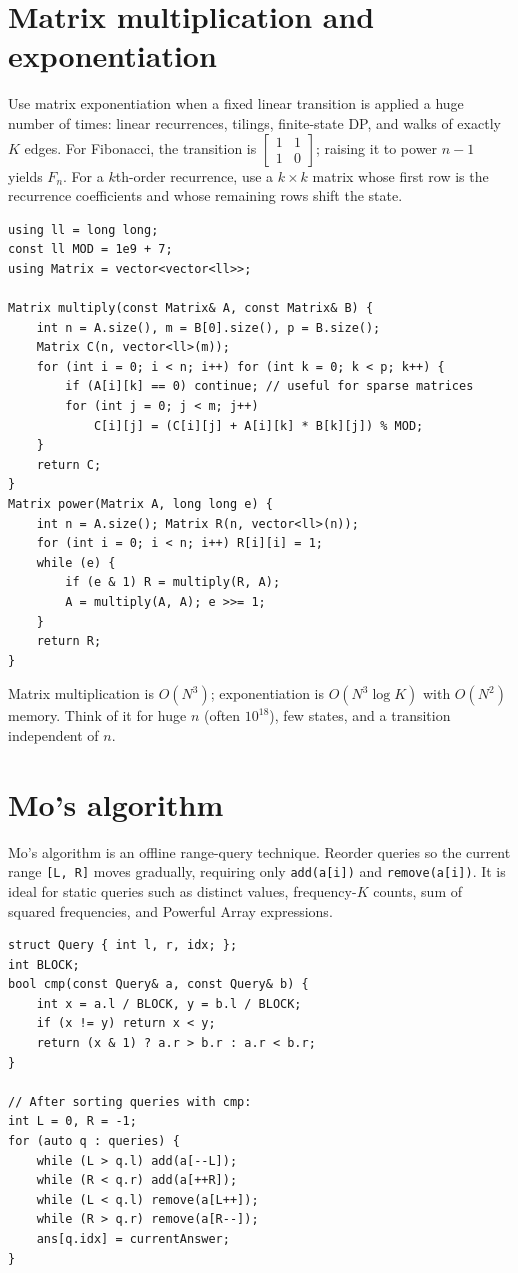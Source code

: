 \section{Matrix multiplication and exponentiation}

Use matrix exponentiation when a fixed linear transition is applied a huge number of times: linear recurrences, tilings, finite-state DP, and walks of exactly $K$ edges. For Fibonacci, the transition is $\begin{bmatrix}1&1\\1&0\end{bmatrix}$; raising it to power $n-1$ yields $F_n$. For a $k$th-order recurrence, use a $k \times k$ matrix whose first row is the recurrence coefficients and whose remaining rows shift the state.

\begin{lstlisting}
using ll = long long;
const ll MOD = 1e9 + 7;
using Matrix = vector<vector<ll>>;

Matrix multiply(const Matrix& A, const Matrix& B) {
    int n = A.size(), m = B[0].size(), p = B.size();
    Matrix C(n, vector<ll>(m));
    for (int i = 0; i < n; i++) for (int k = 0; k < p; k++) {
        if (A[i][k] == 0) continue; // useful for sparse matrices
        for (int j = 0; j < m; j++)
            C[i][j] = (C[i][j] + A[i][k] * B[k][j]) % MOD;
    }
    return C;
}
Matrix power(Matrix A, long long e) {
    int n = A.size(); Matrix R(n, vector<ll>(n));
    for (int i = 0; i < n; i++) R[i][i] = 1;
    while (e) {
        if (e & 1) R = multiply(R, A);
        A = multiply(A, A); e >>= 1;
    }
    return R;
}
\end{lstlisting}

Matrix multiplication is $O(N^3)$; exponentiation is $O(N^3 \log K)$ with $O(N^2)$ memory. Think of it for huge $n$ (often $10^{18}$), few states, and a transition independent of $n$.

\section{Mo's algorithm}

Mo's algorithm is an offline range-query technique. Reorder queries so the current range \texttt{[L, R]} moves gradually, requiring only \texttt{add(a[i])} and \texttt{remove(a[i])}. It is ideal for static queries such as distinct values, frequency-$K$ counts, sum of squared frequencies, and Powerful Array expressions.

\begin{lstlisting}
struct Query { int l, r, idx; };
int BLOCK;
bool cmp(const Query& a, const Query& b) {
    int x = a.l / BLOCK, y = b.l / BLOCK;
    if (x != y) return x < y;
    return (x & 1) ? a.r > b.r : a.r < b.r;
}

// After sorting queries with cmp:
int L = 0, R = -1;
for (auto q : queries) {
    while (L > q.l) add(a[--L]);
    while (R < q.r) add(a[++R]);
    while (L < q.l) remove(a[L++]);
    while (R > q.r) remove(a[R--]);
    ans[q.idx] = currentAnswer;
}
\end{lstlisting}

